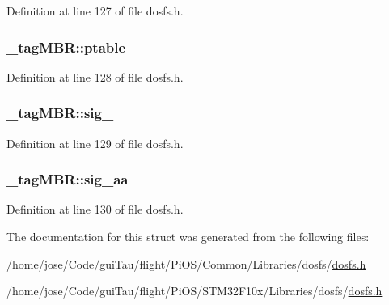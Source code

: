 Definition at line 127 of file dosfs.\-h.

\hypertarget{struct__tag_m_b_r_aea30f6b40de3831f6d550a3a93e620a3}{
\subsubsection[{ptable}]{ \-\_\-tag\-M\-B\-R\-::ptable}}\label{struct__tag_m_b_r_aea30f6b40de3831f6d550a3a93e620a3}


Definition at line 128 of file dosfs.\-h.

\hypertarget{struct__tag_m_b_r_aee1e69049db8d559180250167e1d80f6}{
\subsubsection[{sig\-\_\-55}]{ \-\_\-tag\-M\-B\-R\-::sig\-\_}}\label{struct__tag_m_b_r_aee1e69049db8d559180250167e1d80f6}


Definition at line 129 of file dosfs.\-h.

\hypertarget{struct__tag_m_b_r_a58d7eae6321ec3f9b7eca19c79cf21b4}{
\subsubsection[{sig\-\_\-aa}]{ \-\_\-tag\-M\-B\-R\-::sig\-\_\-aa}}\label{struct__tag_m_b_r_a58d7eae6321ec3f9b7eca19c79cf21b4}


Definition at line 130 of file dosfs.\-h.



The documentation for this struct was generated from the following files\-:\begin{DoxyCompactItemize}
\item 
/home/jose/\-Code/gui\-Tau/flight/\-Pi\-O\-S/\-Common/\-Libraries/dosfs/\hyperlink{_common_2_libraries_2dosfs_2dosfs_8h}{dosfs.\-h}\item 
/home/jose/\-Code/gui\-Tau/flight/\-Pi\-O\-S/\-S\-T\-M32\-F10x/\-Libraries/dosfs/\hyperlink{_s_t_m32_f10x_2_libraries_2dosfs_2dosfs_8h}{dosfs.\-h}\end{DoxyCompactItemize}
